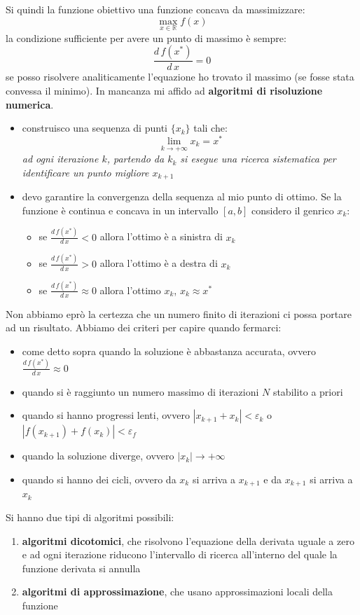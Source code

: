 \documentclass[a4paper,12pt, oneside]{book}
\begin{document}
Si quindi la funzione obiettivo una funzione concava da massimizzare:
\[\max_{x\in\mathbb{R}}f(x)\]
la condizione sufficiente per avere un punto di massimo è sempre:
\[\frac{d\,f(x^*)}{d\,x}=0\]
se posso risolvere analiticamente l'equazione ho trovato il massimo
(se fosse stata convessa il minimo). In mancanza mi affido ad
\textbf{algoritmi di risoluzione numerica}.
\begin{itemize}
  \item construisco una sequenza di punti $\{x_k\}$ tali che:
  \[\lim_{k\to +\infty}x_k=x^*\]
  \textit{ad ogni iterazione $k$, partendo da $k_k$ si esegue una
    ricerca sistematica per identificare un punto migliore $x_{k+1}$}
  \item devo garantire la convergenza della sequenza al mio punto di
  ottimo. Se la funzione è continua e concava in un intervallo $[a,b]$
  considero il genrico $x_k$:
  \begin{itemize}
    \item se $\frac{d\,f(x^*)}{d\,x}<0$ allora l'ottimo è a sinistra
    di $x_k$
     \item se $\frac{d\,f(x^*)}{d\,x}>0$ allora l'ottimo è a destra
     di $x_k$
     \item se $\frac{d\,f(x^*)}{d\,x}\approx 0$ allora l'ottimo $x_k$,
     $x_k\approx x^*$
  \end{itemize}
\end{itemize}
Non abbiamo eprò la certezza che un numero finito di iterazioni ci
possa portare ad un risultato. Abbiamo dei criteri per capire quando
fermarci:
\begin{itemize}
  \item come detto sopra quando la soluzione è abbastanza accurata,
  ovvero $\frac{d\,f(x^*)}{d\,x}\approx 0$
  \item quando si è raggiunto un numero massimo di iterazioni $N$
  stabilito a priori
  \item quando si hanno progressi lenti, ovvero
  $|x_{k+1}+x_k|<\varepsilon_k$ o $|f(x_{k+1})+f(x_k)|<\varepsilon_f$
  \item quando la soluzione diverge, ovvero $|x_k|\to+\infty$
  \item quando si hanno dei cicli, ovvero da $x_k$ si arriva a
  $x_{k+1}$ e da $x_{k+1}$ si arriva a $x_k$ 
\end{itemize}
Si hanno due tipi di algoritmi possibili:
\begin{enumerate}
  \item \textbf{algoritmi dicotomici}, che risolvono l'equazione
  della derivata uguale a zero e ad ogni iterazione riducono
  l'intervallo di ricerca all'interno del quale la funzione derivata
  si annulla
  \item \textbf{algoritmi di approssimazione}, che usano
  approssimazioni locali della funzione
\end{enumerate}
\end{document}
